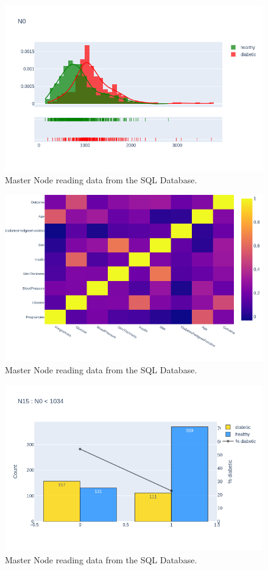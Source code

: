 \documentclass[12pt]{article}
\begin{document}
\begin{figure}[ht]
\centering
\includegraphics[width=1\textwidth]{newplot(39).png}
\caption{Master Node reading data from the SQL Database.}
\end{figure}

\begin{figure}[ht]
\centering
\includegraphics[width=1\textwidth]{newplot(3).png}
\caption{Master Node reading data from the SQL Database.}
\end{figure}

\begin{figure}[ht]
\centering
\includegraphics[width=1\textwidth]{newplot(40).png}
\caption{Master Node reading data from the SQL Database.}
\end{figure}
\end{document}
